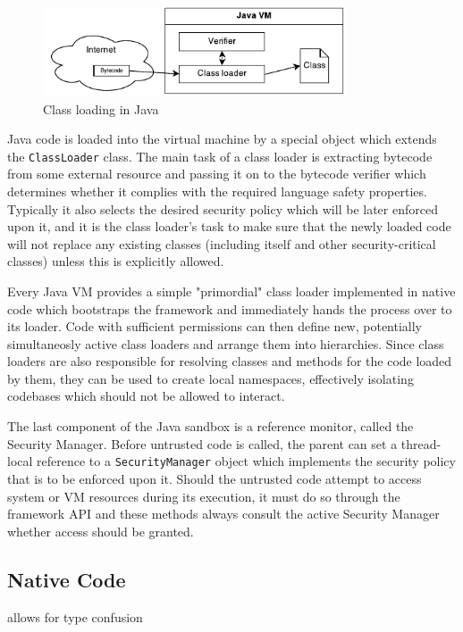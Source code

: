 \documentclass[a4paper,12pt,twoside,openright]{report}
\begin{document}
\begin{figure}
	\centering
	\includegraphics[width=0.8\textwidth]{dia_java_classload.pdf}
	\caption{Class loading in Java}
\end{figure}

Java code is loaded into the virtual machine by a special object which extends the \texttt{ClassLoader} class. The main task of a class loader is extracting bytecode from some external resource and passing it on to the bytecode verifier which determines whether it complies with the required language safety properties. Typically it also selects the desired security policy which will be later enforced upon it, and it is the class loader's task to make sure that the newly loaded code will not replace any existing classes (including itself and other security-critical classes) unless this is explicitly allowed. 

Every Java VM provides a simple "primordial" class loader implemented in native code which bootstraps the framework and immediately hands the process over to its loader. Code with sufficient permissions can then define new, potentially simultaneosly active class loaders and arrange them into hierarchies. Since class loaders are also responsible for resolving classes and methods for the code loaded by them, they can be used to create local namespaces, effectively isolating codebases which should not be allowed to interact.

The last component of the Java sandbox is a reference monitor, called the Security Manager. Before untrusted code is called, the parent can set a thread-local reference to a \texttt{SecurityManager} object which implements the security policy that is to be enforced upon it. Should the untrusted code attempt to access system or VM resources during its execution, it must do so through the framework API and these methods always consult the active Security Manager whether access should be granted.

\subsection{Native Code}

allows for type confusion
\end{document}
